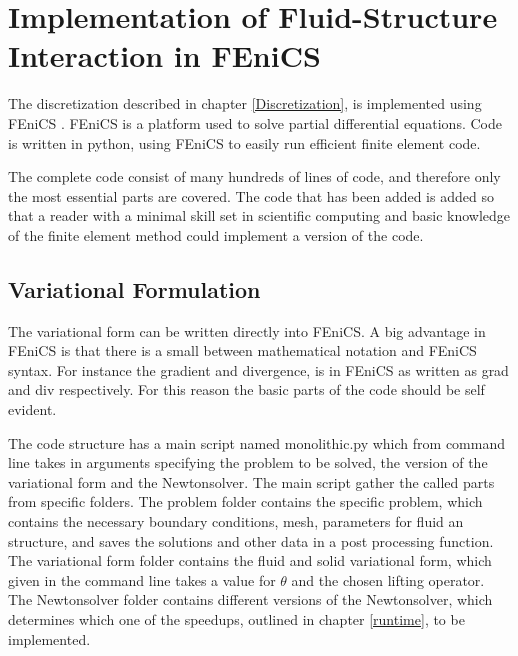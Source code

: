 \begin{comment}
\lstdefinelanguage{Python}{
 keywords={typeof, null, catch, switch, in, int, str, float, self},
 ndkeywords={boolean, throw, import},
 ndkeywords={return, class, if ,elif, endif, while, do, else, True, False , catch, def},
 ndkeywordstyle=\color{blue}\bfseries,
 identifierstyle=\color{black},
 sensitive=false,
 comment=[l]{\#},
 morecomment=[s]{/*}{*/},
 commentstyle=\color{purple}\ttfamily,
 stringstyle=\color{red}\ttfamily,
 backgroundcolor = \color{lightgray}
}
\end{comment}


\chapter{Implementation of Fluid-Structure Interaction in FEniCS}
The discretization described in chapter \ref{Discretization}, is implemented using FEniCS \cite{FENICS}. FEniCS is a platform used to solve partial differential equations. Code is written in python, using FEniCS to easily run efficient finite element code. \newline

The complete code consist of many hundreds of lines of code, and therefore only the most essential parts are covered. The code that has been added is added so that a reader with a minimal skill set in scientific computing and basic knowledge of the finite element method could implement a version of the code.

\section{Variational Formulation}

The variational form can be written directly into FEniCS. A big advantage in FEniCS is that there is a small  between mathematical notation and FEniCS syntax. For instance the gradient and divergence, is in FEniCS as written as grad and div respectively. For this reason the basic parts of the code should be self evident.

The code structure has a main script named monolithic.py which from command line takes in arguments specifying the problem to be solved, the version of the variational form and the Newtonsolver. The main script gather the called parts from specific folders. The problem folder contains the specific problem, which contains the necessary boundary conditions, mesh, parameters for fluid an structure, and saves the solutions and other data in a post processing function. The variational form folder contains the fluid and solid variational form, which given in the command line takes a value for $\theta$ and the chosen lifting operator. The Newtonsolver folder contains different versions of the Newtonsolver, which determines which one of the speedups, outlined in chapter \ref{runtime}, to be implemented.

